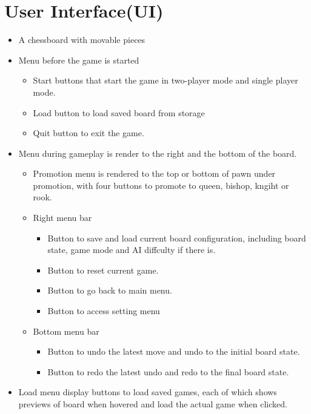 \documentclass[a4paper, 10pt, titlepage]{report}
\begin{document}
\section{User Interface(UI)}
\begin{itemize}
  \item A chessboard with movable pieces

  \item Menu before the game is started
        \begin{itemize}
          \item Start buttons that start the game in two-player mode and single player mode.
          \item Load button to load saved board from storage
          \item Quit button to exit the game.
        \end{itemize}
  \item Menu during gameplay is render to the right and the bottom of the board.
        \begin{itemize}
          \item Promotion menu is rendered to the top or bottom of pawn under promotion, with four buttons to promote to queen, bishop, kngiht or rook.
          \item Right menu bar

                \begin{itemize}
                  \item Button to save and load current board configuration, including board state, game mode and AI diffculty if there is.
                  \item Button to reset current game.
                  \item Button to go back to main menu.
                  \item Button to access setting menu
                \end{itemize}

          \item Bottom menu bar
                \begin{itemize}
                  \item Button to undo the latest move and undo to the initial board state.
                  \item Button to redo the latest undo and redo to the final board state.
                \end{itemize}
        \end{itemize}
    \item Load menu display buttons to load saved games, each of which shows previews of board when hovered and load the actual game when clicked. 
\end{itemize}
\end{document}
